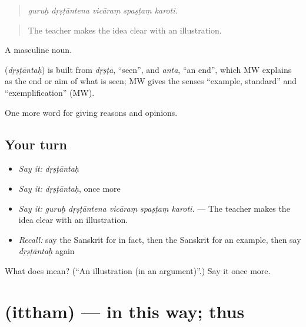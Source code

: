 \begin{quote}
\emph{guruḥ dṛṣṭāntena vicāraṃ spaṣṭaṃ karoti.}
\end{quote}

\begin{quote}
The teacher makes the idea clear with an illustration.
\end{quote}

A masculine noun.

\begin{cousinweb}
\textbf{} (\emph{dṛṣṭāntaḥ}) is built from \emph{dṛṣṭa}, \textquotedblleft{}seen\textquotedblright{}, and \emph{anta}, \textquotedblleft{}an end\textquotedblright{}, which MW explains as the end or aim of what is seen; MW gives the senses \textquotedblleft{}example, standard\textquotedblright{} and \textquotedblleft{}exemplification\textquotedblright{} (MW).
\end{cousinweb}

\begin{grammarlens}[title={What you've built}]
One more word for giving reasons and opinions.
\end{grammarlens}

\subsection*{Your turn}
\begin{itemize}
\raggedright
  \item \emph{Say it:} \emph{dṛṣṭāntaḥ}
  \item \emph{Say it:} \emph{dṛṣṭāntaḥ}, once more
  \item \emph{Say it:} \emph{guruḥ dṛṣṭāntena vicāraṃ spaṣṭaṃ karoti.} — The teacher makes the idea clear with an illustration.
  \item \emph{Recall:} say the Sanskrit for in fact, then the Sanskrit for an example, then say \emph{dṛṣṭāntaḥ} again
\end{itemize}

\begin{tcolorbox}[breakable,colback=teal!4,colframe=teal!35!black,title={Before you move on}]
What does  mean? (\textquotedblleft{}An illustration (in an argument)\textquotedblright{}.) Say it once more.
\end{tcolorbox}
\section[\texorpdfstring{\sk{इत्थम्} (ittham)}{इत्थम् (ittham)}]{ (ittham) — in this way; thus}

